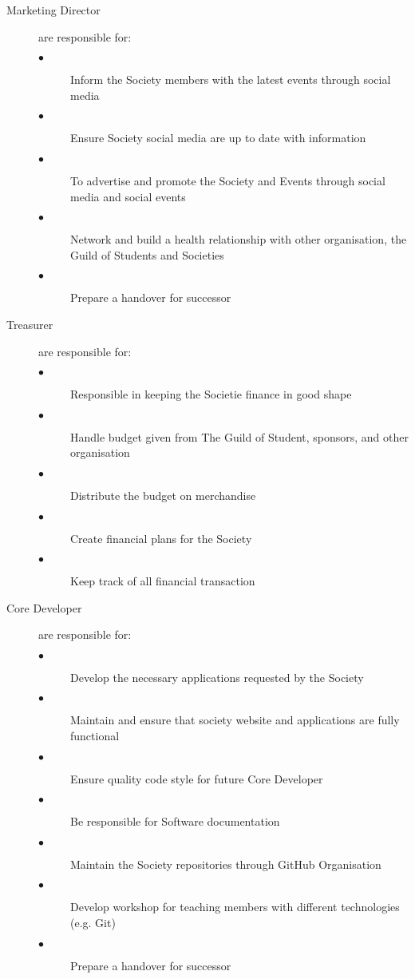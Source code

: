 \documentclass[10pt, a4paper, onecolumn]{report}
\begin{document}
\begin{description}
    \item[Marketing Director] are responsible for:
      \begin{description}
        \item[$\bullet$] Inform the Society members with the latest events through social media
        \item[$\bullet$] Ensure Society social media are up to date with information
        \item[$\bullet$] To advertise and promote the Society and Events through social media 
        and social events
        \item[$\bullet$] Network and build a health relationship with other organisation,
        the Guild of Students and Societies
        \item[$\bullet$] Prepare a handover for successor
      \end{description}

    \item[Treasurer] are responsible for: 
      \begin{description}
        \item[$\bullet$] Responsible in keeping the Societie finance in good shape
        \item[$\bullet$] Handle budget given from The Guild of Student, 
        sponsors, and other organisation
        \item[$\bullet$] Distribute the budget on merchandise
        \item[$\bullet$] Create financial plans for the Society
        \item[$\bullet$] Keep track of all financial transaction
      \end{description}

    \item[Core Developer] are responsible for: 
      \begin{description}
        \item[$\bullet$] Develop the necessary applications requested by the Society
        \item[$\bullet$] Maintain and ensure that society website and applications
        are fully functional
        \item[$\bullet$] Ensure quality code style for future Core Developer
        \item[$\bullet$] Be responsible for Software documentation 
        \item[$\bullet$] Maintain the Society repositories through GitHub Organisation
        \item[$\bullet$] Develop workshop for teaching members with different
        technologies (e.g. Git)
        \item[$\bullet$] Prepare a handover for successor
      \end{description}


\end{description}
\end{document}
